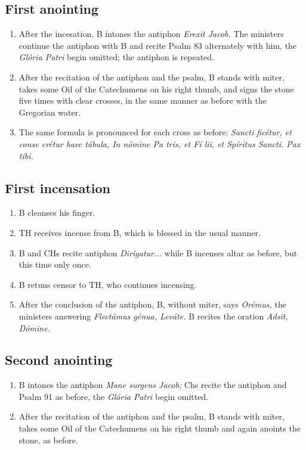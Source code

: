 \documentclass[letterpaper, twocolumn]{article}
\begin{document}
\subsection*{First anointing}
\begin{enumerate}
	\item After the incesation, B intones the antiphon \textit{Erexit Jacob.} The ministers continue the antiphon with B and recite Psalm 83 alternately with him, the \textit{Glória Patri} begin omitted; the antiphon is repeated.
	\item After the recitation of the antiphon and the psalm, B stands with miter, takes some Oil of the Catechumens on his right thumb, and signs the stone five times with clear crosses, in the same manner as before with the Gregorian water. 
	\item The same formula is pronounced for each cross as before: \textit{Sancti  ficétur, et conse  crétur haec tábula, In nómine Pa  tris, et Fí  lii, et Spíritus  Sancti. Pax tibi.}
\end{enumerate}
\subsection*{First incensation}
\begin{enumerate}
	\item B cleanses his finger.
	\item TH receives incense from B, which is blessed in the usual manner.
	\item B and CHs recite antiphon \textit{Dirigatur...} while B incenses altar as before, but this time only once.
	\item B retuns censor to TH, who continues incensing.
	\item After the conclusion of the antiphon, B, without miter, says \textit{Orémus,} the ministers answering \textit{Flectámus génua, Leváte.} B recites the oration \textit{Adsit, Dómine.}
\end{enumerate}
\subsection*{Second anointing}
\begin{enumerate}
	\item B intones the antiphon \textit{Mane surgens Jacob;} Chs recite the antiphon and Psalm 91 as before, the \textit{Glória Patri} begin omitted.
	\item After the recitation of the antiphon and the psalm, B stands with miter, takes some Oil of the Catechumens on his right thumb and again anoints the stone, as before.
\end{enumerate}
\end{document}
